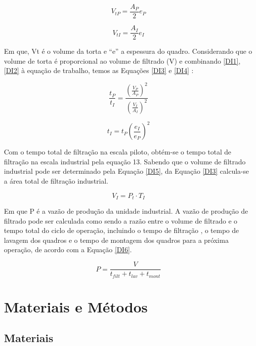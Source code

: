 \begin{equation}\label{DI1}
V_{t P}=\frac{A_{P}}{2} e_{P}
\end{equation}

\begin{equation}\label{DI2}
V_{t I}=\frac{A_{I}}{2} e_{I}
\end{equation}


Em que, Vt é o volume da torta e  “e” a espessura do quadro. Considerando que o volume de torta é proporcional ao volume de filtrado (V) e combinando \ref{DI1}, \ref{DI2} à equação de trabalho, temos as Equações \ref{DI3} e \ref{DI4} :

\begin{equation}\label{DI3}
\frac{t_{P}}{t_{I}}=\frac{\left(\frac{V_{P}}{A_{P}}\right)^{2}}{\left(\frac{V_{I}}{A_{I}}\right)^{2}}
\end{equation}

\begin{equation}\label{DI4}
t_{I}=t_{P}\left(\frac{e_{I}}{e_{P}}\right)^{2}
\end{equation}


Com o tempo total de filtração na escala piloto, obtém-se o tempo total de filtração na escala industrial pela equação 13. Sabendo que o volume de filtrado industrial pode ser determinado pela Equação \ref{DI5}, da Equação \ref{DI3} calcula-se a área total de filtração industrial.

\begin{equation}\label{DI5}
V_{I}=P_{t} \cdot T_{I}
\end{equation}

Em que P é a vazão de produção da unidade industrial.
A vazão de produção de filtrado pode ser calculada como sendo a razão entre o volume de filtrado e o tempo total do ciclo de operação, incluindo o tempo de filtração , o tempo de lavagem dos quadros  e o tempo de montagem dos quadros  para a próxima operação, de acordo com a Equação \ref{DI6}. 

\begin{equation}\label{DI6}
P=\frac{V}{t_{f i l t}+t_{l a v}+t_{m o n t}}
\end{equation}


\chapter{Materiais e Métodos}

\section{Materiais}

